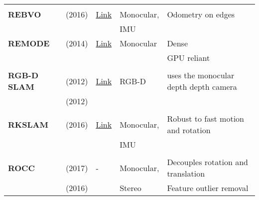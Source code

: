 {\begin{longtable}{l|l|l|l|l}
			&                                   &                                                                    &                       &\\
			\textbf{REBVO}         & \cite{Tarrio2016} (2016)          & {\href{https://github.com/JuanTarrio/rebvo}{Link}}                 & Monocular,            & Odometry on edges\\
			&                                   &                                                                    & IMU                   &\\
			\textbf{REMODE}        & \cite{Pizzoli2014} (2014)         & {\href{https://github.com/uzh-rpg/rpg_open_remode}{Link}}          & Monocular             & Dense\\
			&                                   &                                                                    &                       & GPU reliant\\
			&                                   &                                                                    &                       &\\
			\textbf{RGB-D SLAM}    & \cite{Endres2012} (2012)          & {\href{https://github.com/felixendres/rgbdslam_v2}{Link}}          & RGB-D                 & uses the monocular depth depth camera \\
			& \cite{Endres2012a} (2012)         &                                                                    &                       &\\
			&                                   &                                                                    &                       &\\
			\textbf{RKSLAM}        & \cite{Liu2016} (2016)             & {\href{https://zjucvg.net/rkslam/rkslam.html}{Link}}               & Monocular,            & Robust to fast motion and rotation\\
			&                                   &                                                                    & IMU                   &\\
			&                                   &                                                                    &                       &\\
			\textbf{ROCC}          & \cite{Buczko2017} (2017)          & -                                                                  & Monocular,            & Decouples rotation and translation\\
			& \cite{Buczko2016} (2016)          &                                                                    & Stereo                & Feature outlier removal\\

\end{longtable}}
